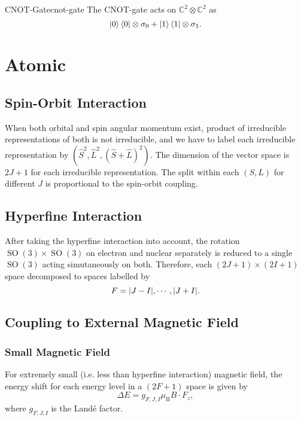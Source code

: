 \documentclass{article}
\begin{document}
\begin{theorem}{CNOT-Gate}{cnot-gate}
    The CNOT-gate acts on $\mathbb{C}^2 \otimes \mathbb{C}^2$ as
    \[ \ket{0}\bra{0} \otimes \sigma_0 + \ket{1}\bra{1} \otimes \sigma_1. \]
\end{theorem}

\section{Atomic}

\subsection{Spin-Orbit Interaction}

When both orbital and spin angular momentum exist, product of irreducible representations of both is not irreducible, and we have to label each irreducible representation by $(\hat{S}^2, \hat{L}^2, (\hat{S} + \hat{L})^2)$.
The dimension of the vector space is $2J+1$ for each irreducible representation.
The split within each $(S,L)$ for different $J$ is proportional to the spin-orbit coupling.

\subsection{Hyperfine Interaction}

After taking the hyperfine interaction into account, the rotation $\operatorname{SO}(3)\times \operatorname{SO}(3)$ on electron and nuclear separately is reduced to a single $\operatorname{SO}(3)$ acting simutaneously on both. Therefore, each $(2J+1) \times (2I+1)$ space decomposed to spaces labelled by
\[ F = \abs{J-I}, \cdots, \abs{J+I}. \]

\subsection{Coupling to External Magnetic Field}

\subsubsection{Small Magnetic Field}

For extremely small (i.e. less than hyperfine interaction) magnetic field, the energy shift for each energy level in a $(2F+1)$ space is given by
\[ \Delta E = g_{F,J,I} \mu_{\mathrm{B}} B \cdot F_z, \]
where $g_{F,J,I}$ is the Land\'e factor.
\end{document}

